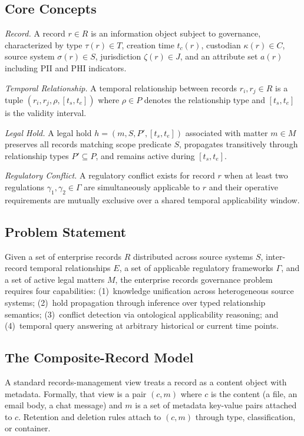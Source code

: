 \documentclass{ieeeaccess}
\begin{document}
\subsection{Core Concepts}

\textit{Record.} A record $r \in R$ is an information object subject to governance, characterized by type $\tau(r) \in T$, creation time $t_c(r)$, custodian $\kappa(r) \in C$, source system $\sigma(r) \in S$, jurisdiction $\zeta(r) \in J$, and an attribute set $a(r)$ including PII and PHI indicators.

\textit{Temporal Relationship.} A temporal relationship between records $r_i, r_j \in R$ is a tuple $(r_i, r_j, \rho, [t_s, t_e])$ where $\rho \in P$ denotes the relationship type and $[t_s, t_e]$ is the validity interval.

\textit{Legal Hold.} A legal hold $h = (m, S, P', [t_s, t_e])$ associated with matter $m \in M$ preserves all records matching scope predicate $S$, propagates transitively through relationship types $P' \subseteq P$, and remains active during $[t_s, t_e]$.

\textit{Regulatory Conflict.} A regulatory conflict exists for record $r$ when at least two regulations $\gamma_1, \gamma_2 \in \Gamma$ are simultaneously applicable to $r$ and their operative requirements are mutually exclusive over a shared temporal applicability window.

\subsection{Problem Statement}

Given a set of enterprise records $R$ distributed across source systems $S$, inter-record temporal relationships $E$, a set of applicable regulatory frameworks $\Gamma$, and a set of active legal matters $M$, the enterprise records governance problem requires four capabilities: (1)~knowledge unification across heterogeneous source systems; (2)~hold propagation through inference over typed relationship semantics; (3)~conflict detection via ontological applicability reasoning; and (4)~temporal query answering at arbitrary historical or current time points.

\subsection{The Composite-Record Model}
\label{sec:composite}

A standard records-management view treats a record as a content object with metadata. Formally, that view is a pair $(c, m)$ where $c$ is the content (a file, an email body, a chat message) and $m$ is a set of metadata key-value pairs attached to $c$. Retention and deletion rules attach to $(c, m)$ through type, classification, or container.
\end{document}
